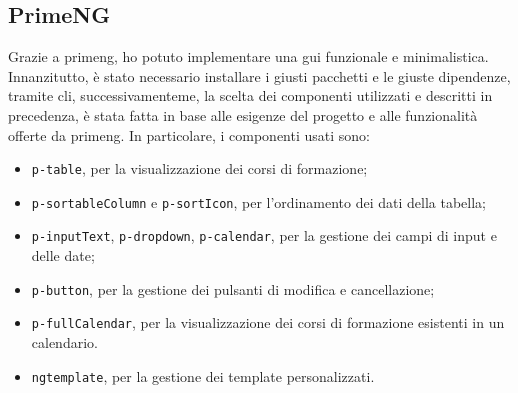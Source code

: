 \subsection{PrimeNG}\label{subsec:primeng}
Grazie a \acrshort{primeng}, ho potuto implementare una \acrshort{gui} funzionale e minimalistica.
Innanzitutto, è stato necessario installare i giusti pacchetti e le giuste dipendenze, tramite \acrshort{cli}, successivamenteme, la scelta dei componenti utilizzati e descritti in precedenza, è stata fatta in base alle esigenze del progetto e alle funzionalità offerte da \acrshort{primeng}.
In particolare, i componenti usati sono:
\begin{itemize}
  \item \texttt{p-table}, per la visualizzazione dei corsi di formazione;
  \item \texttt{p-sortableColumn} e \texttt{p-sortIcon}, per l'ordinamento dei dati della tabella;
  \item \texttt{p-inputText}, \texttt{p-dropdown}, \texttt{p-calendar}, per la gestione dei campi di input e delle date;
  \item \texttt{p-button}, per la gestione dei pulsanti di modifica e cancellazione;
  \item \texttt{p-fullCalendar}, per la visualizzazione dei corsi di formazione esistenti in un calendario.
  \item \texttt{ngtemplate}, per la gestione dei template personalizzati.
\end{itemize}


